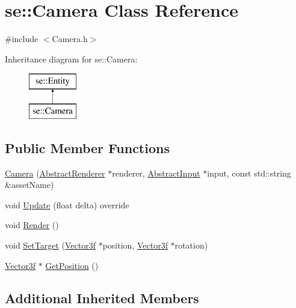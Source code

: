 \hypertarget{classse_1_1_camera}{}\section{se\+:\+:Camera Class Reference}
\label{classse_1_1_camera}


{\ttfamily \#include $<$Camera.\+h$>$}

Inheritance diagram for se\+:\+:Camera\+:\begin{figure}[H]
\begin{center}
\leavevmode
\includegraphics[height=2.000000cm]{classse_1_1_camera}
\end{center}
\end{figure}
\subsection*{Public Member Functions}
\begin{DoxyCompactItemize}
\item 
\mbox{\hyperlink{classse_1_1_camera_a45cc397abfbd7287d96dbbb70330f2e5}{Camera}} (\mbox{\hyperlink{classse_1_1_abstract_renderer}{Abstract\+Renderer}} $\ast$renderer, \mbox{\hyperlink{classse_1_1_abstract_input}{Abstract\+Input}} $\ast$input, const std\+::string \&asset\+Name)
\item 
void \mbox{\hyperlink{classse_1_1_camera_abecf2d50dc793707a475b35bb487812c}{Update}} (float delta) override
\item 
void \mbox{\hyperlink{classse_1_1_camera_a8331699adb431843563dfdab355e54f0}{Render}} ()
\item 
void \mbox{\hyperlink{classse_1_1_camera_ac49219007d931e1800a33d2603f08856}{Set\+Target}} (\mbox{\hyperlink{namespacese_a12e07512d95e2fdebdaf74a5ea2cf5f6}{Vector3f}} $\ast$position, \mbox{\hyperlink{namespacese_a12e07512d95e2fdebdaf74a5ea2cf5f6}{Vector3f}} $\ast$rotation)
\item 
\mbox{\hyperlink{namespacese_a12e07512d95e2fdebdaf74a5ea2cf5f6}{Vector3f}} $\ast$ \mbox{\hyperlink{classse_1_1_camera_a9d163903ddf8f4c5fa8cee70dbfec689}{Get\+Position}} ()
\end{DoxyCompactItemize}
\subsection*{Additional Inherited Members}


